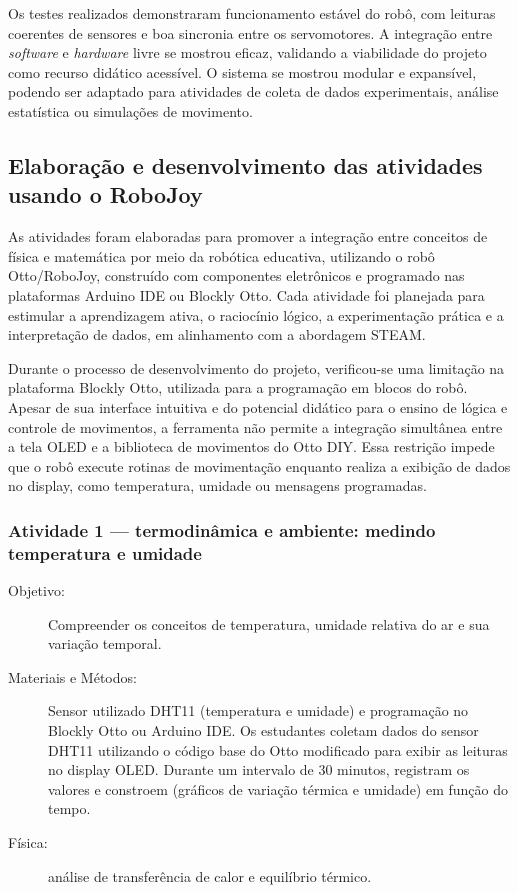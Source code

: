 \documentclass[portuguese]{textolivre}
\begin{document}
Os testes realizados demonstraram funcionamento estável do robô, com leituras coerentes de sensores e boa sincronia entre os servomotores. A integração entre \textit{software} e \textit{hardware} livre se mostrou eficaz, validando a viabilidade do projeto como recurso didático acessível.
O sistema se mostrou modular e expansível, podendo ser adaptado para atividades de coleta de dados experimentais, análise estatística ou simulações de movimento.


\subsection{Elaboração e desenvolvimento das atividades usando o RoboJoy}

As atividades foram elaboradas para promover a integração entre conceitos de física e matemática por meio da robótica educativa, utilizando o robô Otto/RoboJoy, construído com componentes eletrônicos e programado nas plataformas Arduino IDE ou Blockly Otto. Cada atividade foi planejada para estimular a aprendizagem ativa, o raciocínio lógico, a experimentação prática e a interpretação de dados, em alinhamento com a abordagem STEAM.

Durante o processo de desenvolvimento do projeto, verificou-se uma limitação na plataforma Blockly Otto, utilizada para a programação em blocos do robô. Apesar de sua interface intuitiva e do potencial didático para o ensino de lógica e controle de movimentos, a ferramenta não permite a integração simultânea entre a tela OLED e a biblioteca de movimentos do Otto DIY. Essa restrição impede que o robô execute rotinas de movimentação enquanto realiza a exibição de dados no display, como temperatura, umidade ou mensagens programadas.

\subsubsection{Atividade 1 — termodinâmica e ambiente: medindo temperatura e umidade}

\begin{description}
\item[Objetivo:] Compreender os conceitos de temperatura, umidade relativa do ar e sua variação temporal.
\item[Materiais e Métodos:] Sensor utilizado DHT11 (temperatura e umidade) e programação no Blockly Otto ou Arduino IDE.
Os estudantes coletam dados do sensor DHT11 utilizando o código base do Otto modificado para exibir as leituras no display OLED. Durante um intervalo de 30 minutos, registram os valores e constroem (gráficos de variação térmica e umidade) em função do tempo.
\item[Física:] análise de transferência de calor e equilíbrio térmico.
\end{description}
\end{document}
